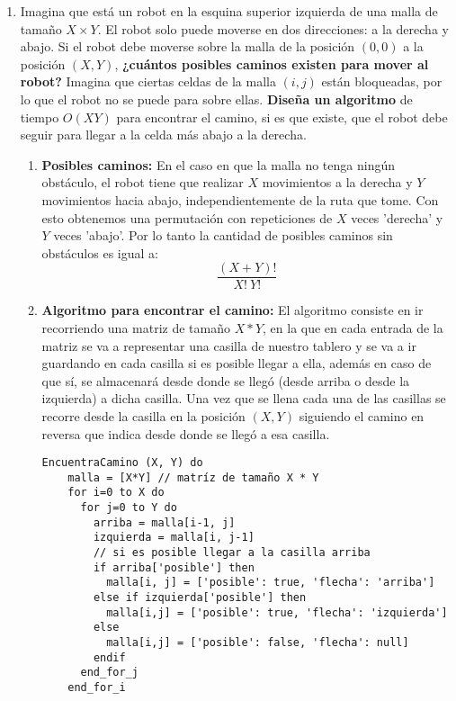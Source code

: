 \documentclass[11pt,letterpaper]{article}
\begin{document}
  \begin{enumerate}[leftmargin=*]
    \item Imagina que está un robot en la esquina superior izquierda de una malla de tamaño $X \times Y$. El robot solo puede moverse en dos direcciones: a la derecha y abajo. Si el robot debe moverse sobre la malla de la posición $(0,0)$ a la posición $(X,Y)$, \textbf{¿cuántos posibles caminos existen para mover al robot?} Imagina que ciertas celdas de la malla $(i,j)$ están bloqueadas, por lo que el robot no se puede para sobre ellas. \textbf{Diseña un algoritmo} de tiempo $O(XY)$ para encontrar el camino, si es que existe, que el robot debe seguir para llegar a la celda más abajo a la derecha.
    \begin{enumerate}[label=\roman*)]
      \item \textbf{Posibles caminos:} En el caso en que la malla no tenga ningún obstáculo, el robot tiene que realizar $X$ movimientos a la derecha y $Y$ movimientos hacia abajo, independientemente de la ruta que tome. Con esto obtenemos una permutación con repeticiones de $X$ veces 'derecha' y $Y$ veces 'abajo'. Por lo tanto la cantidad de posibles caminos sin obstáculos es igual a:
      \[
        \frac{(X+Y)!}{X! \ Y!} 
      \]
      
      \item \textbf{Algoritmo para encontrar el camino:} El algoritmo consiste en ir recorriendo una matriz de tamaño $X*Y$, en la que en cada entrada de la matriz se va a representar una casilla de nuestro tablero y se va a ir guardando en cada casilla si es posible llegar a ella, además en caso de que sí, se almacenará desde donde se llegó (desde arriba o desde la izquierda) a dicha casilla. Una vez que se llena cada una de las casillas se recorre desde la casilla en la posición $(X,Y)$ siguiendo el camino en reversa que indica desde donde se llegó a esa casilla.
      
      \begin{lstlisting}[caption=Encontrar camino en matríz de $X\times Y$]
  EncuentraCamino (X, Y) do
    malla = [X*Y] // matríz de tamaño X * Y
    for i=0 to X do
      for j=0 to Y do
        arriba = malla[i-1, j]
        izquierda = malla[i, j-1]
        // si es posible llegar a la casilla arriba
        if arriba['posible'] then
          malla[i, j] = ['posible': true, 'flecha': 'arriba']
        else if izquierda['posible'] then
          malla[i,j] = ['posible': true, 'flecha': 'izquierda']
        else
          malla[i,j] = ['posible': false, 'flecha': null]
        endif
      end_for_j
    end_for_i
    

\end{lstlisting}
\end{enumerate}
\end{enumerate}
\end{document}
